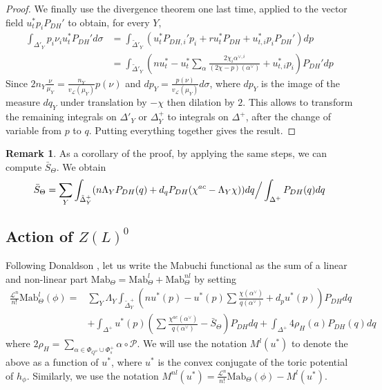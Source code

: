 \documentclass{amsart}
\theoremstyle{definition}
\newtheorem{rem}[thm]{Remark}
\begin{document}
\begin{proof}
We finally use the divergence theorem one last time, applied to 
the vector field $u_t^*p_iP_{DH}'$
to obtain, for every $Y$,  
\begin{align*}
\int_{\Delta'_Y} p_i\nu_i u_t^*P_{DH}'d\sigma
& = 
\int_{\tilde{\Delta}'_Y} (u_t^*P_{DH,i}'p_i+ru_t^*P_{DH}+u^*_{t,i}p_iP_{DH}')dp \\
& = 
\int_{\tilde{\Delta}'_Y} (nu_t^*-u_t^*\sum_{\alpha}\frac{2\chi_i\alpha^{\vee,i}}{(2\chi-p)(\alpha^{\vee})}+u^*_{t,i}p_i)P_{DH}'dp 
\end{align*}
Since $2n_Y\frac{\nu}{\mu_Y}=\frac{n_Y}{v_{\mathcal{L}}(\mu_Y)}p(\nu)$
and $dp_Y=\frac{p(\nu)}{v_{\mathcal{L}}(\mu_Y)}d\sigma$, where $dp_Y$ is the 
image of the measure $dq_Y$ under translation by $-\chi$ then dilation by $2$. 
This allows to transform 
the remaining integrals on $\Delta'_Y$ or $\Delta_Y^+$ to 
integrals on $\Delta^+$, after the change of variable from $p$ to $q$.
Putting everything together gives the result.
\end{proof}

\begin{rem}
\label{rem_barS}
As a corollary of the proof, by applying the same steps,  
we can compute $\bar{S}_{\Theta}$. We obtain 
\[
\bar{S}_{\Theta}= \sum_Y \int_{\tilde{\Delta}_Y^+}
(n \Lambda_Y P_{DH}(q) + d_qP_{DH}(\chi^{ac}-\Lambda_Y\chi))dq\Big{/}\int_{\Delta^+}P_{DH}(q)dq
\]
\end{rem}

\subsection{Action of $Z(L)^0$}

Following Donaldson \cite{Don02}, let us write the Mabuchi functional as the sum 
of a linear and non-linear part 
$\mathrm{Mab}_{\Theta}=\mathrm{Mab}^l_{\Theta}+\mathrm{Mab}^{nl}_{\Theta}$ 
by setting
\begin{align*}
\frac{\mathcal{L}^n}{n!} \mathrm{Mab}^l_{\Theta}(\phi) = &
\sum_Y \Lambda_Y 
\int_{\tilde{\Delta}^+_Y} (nu^*(p)-u^*(p)\sum \frac{\chi(\alpha^{\vee})}{q(\alpha^{\vee})} +d_pu^*(p))P_{DH}dq \\
& 
+\int_{\Delta^+} u^*(p)(\sum \frac{\chi^{ac}(\alpha^{\vee})}{q(\alpha^{\vee})}-\bar{S}_{\Theta})P_{DH}dq 
+\int_{\Delta^+}4\rho_H(a)P_{DH}(q)dq
\end{align*}
where $2\rho_H=\sum_{\alpha\in\Phi_{Q^u}\cup\Phi_s^+}\alpha\circ\mathcal{P}$.
We will use the notation $M^l(u^*)$ to denote the above as a function of 
$u^*$, where $u^*$ is the convex conjugate of the toric potential of $h_{\phi}$.
Similarly, we use the notation 
$M^{nl}(u^*)=\frac{\mathcal{L}^n}{n!} \mathrm{Mab}_{\Theta}(\phi)-M^l(u^*)$.
\end{document}

